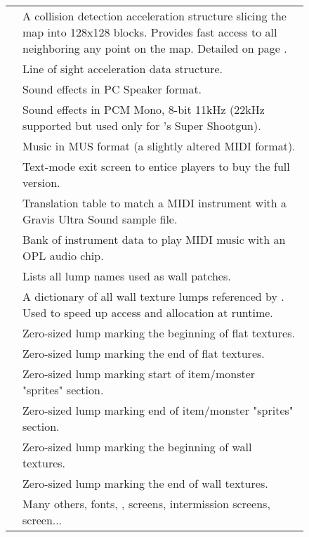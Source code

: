 \begin{figure}[H]
\begin{tabularx}{\textwidth}{ L{0.2}  L{0.8}}
   & A collision detection acceleration structure slicing the map into 128x128 blocks. Provides fast access to all  neighboring any point on the map. Detailed on page \pageref{blockmapdetails}. \\
   &  Line of sight acceleration data structure.\\
  \toprule
   &  Sound effects in PC Speaker format.\\
   &  Sound effects in PCM Mono, 8-bit 11kHz (22kHz supported but used only for \doomii{}'s Super Shootgun).\\
   & Music in MUS format (a slightly altered MIDI format).\\
  \toprule
   & Text-mode exit screen to entice players to buy the full version. \\
   & Translation table to match a MIDI instrument with a Gravis Ultra Sound sample file.\\
   &  Bank of instrument data to play MIDI music with an OPL audio chip.\\
   &  Lists all lump names used as wall patches.\\
   &  A dictionary of all wall texture lumps referenced by . Used to speed up access and allocation at runtime.\\  
   &  Zero-sized lump marking the beginning of flat textures.\\  
   &   Zero-sized lump marking the end of flat textures.\\  
   & Zero-sized lump marking start of item/monster "sprites" section. \\  
   & Zero-sized lump marking end of item/monster "sprites" section. \\  
   & Zero-sized lump marking the beginning of wall textures.\\
   & Zero-sized lump marking the end of wall textures.\\
   &  Many others, fonts, ,  screens, intermission screens,  screen... \\  
   \toprule
\end{tabularx}
\end{figure}
\par
\pagebreak






